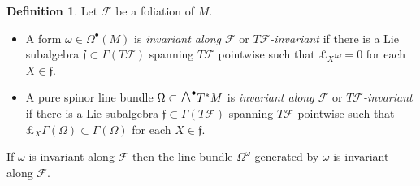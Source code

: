\documentclass[a4paper, reqno, 11pt]{amsart}
\numberwithin{equation}{section}
\theoremstyle{definition}
\newtheorem{definition}[equation]{Definition}
\newcommand{\sfgamma}{\mathsf{\Gamma}}
\newcommand{\frf}{\mathfrak{f}}
\newcommand{\cF}{{\mathcal F}}
\newcommand{\sfOmega}{{\mathsf{\Omega}}}
\newcommand{\midwedge}{\text {\Large$\wedge$}}
\theoremstyle{remark}
\begin{document}
\begin{definition}\label{def:invariantforms}
    Let $\cF$ be a foliation of $M$. 
    \begin{itemize}
        \item[(a)] 
    A form $\omega\in \sfOmega^\bullet(M)$ is  \emph{invariant along $\cF$} or \emph{$T\cF$-invariant} if there is a Lie subalgebra $\frf \subset \sfgamma(T\cF)$ spanning $T\cF$ pointwise such that $\pounds_X \omega = 0$ for each $X \in \frf$. \\[-3mm]
    \item [(b)] A pure spinor line bundle $\Omega \subset \midwedge^\bullet T^*M$ is \emph{invariant along $\cF$} or \emph{$T\cF$-invariant} if there is a Lie subalgebra $\frf \subset \sfgamma(T\cF)$ spanning $T\cF$ pointwise such that $\pounds_X \sfgamma(\Omega) \subset \sfgamma(\Omega)$ for each $X \in \frf$. 
    \end{itemize}
\end{definition}

If $\omega$ is invariant along $\cF$ then the line bundle  $\Omega^\omega$ generated by $\omega$ is invariant along $\cF$.
\end{document}
